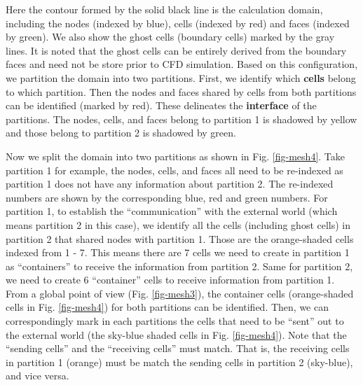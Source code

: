 \documentclass[12pt, letterpaper]{report}
\begin{document}
Here the contour formed by the solid black line is the calculation domain, including the nodes
(indexed by blue), cells (indexed by red) and faces (indexed by green). We also show the ghost cells
(boundary cells) marked by the gray lines. It is noted that the ghost cells can be entirely derived
from the boundary faces and need not be store prior to CFD simulation. Based on this configuration,
we partition the domain into two partitions. First, we identify which {\bf cells} belong to which
partition. Then the nodes and faces shared by cells from both partitions can be identified (marked
by red). These delineates the {\bf interface} of the partitions. The nodes, cells, and faces belong
to partition 1 is shadowed by yellow and those belong to partition 2 is shadowed by green.
\paraspace

Now we split the domain into two partitions as shown in Fig. \ref{fig-mesh4}. Take partition 1 for
example, the nodes, cells, and faces all need to be re-indexed as partition 1 does not have any
information about partition 2. The re-indexed numbers are shown by the corresponding blue, red and
green numbers. For partition 1, to establish the ``communication'' with the external world (which
means partition 2 in this case), we identify all the cells (including ghost cells) in partition 2
that shared nodes with partition 1. Those are the orange-shaded cells indexed from 1 - 7. This means
there are 7 cells we need to create in partition 1 as ``containers'' to receive the information from
partition 2. Same for partition 2, we need to create 6 ``container'' cells to receive information
from partition 1. From a global point of view (Fig. \ref{fig-mesh3}), the container cells
(orange-shaded cells in Fig. \ref{fig-mesh4}) for both partitions can be identified. Then, we can
correspondingly mark in each partitions the cells that need to be ``sent'' out to the external
world (the sky-blue shaded cells in Fig. \ref{fig-mesh4}). Note that the ``sending cells'' and the
``receiving cells'' must match. That is, the receiving cells in partition 1 (orange) must be match
the sending cells in partition 2 (sky-blue), and vice versa.
\end{document}
